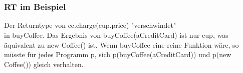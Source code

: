\section*{}
	\begin{frame}[fragile]
	\frametitle{RT im Beispiel}
	\begin{tcolorbox}[colback=blue!5,colframe=brightcerulean,title=RT im Beispiel]
		Der Returntype von cc.charge(cup.price) "verschwindet"\\
		in buyCoffee. Das Ergebnis von buyCoffee(aCreditCard) ist
		nur cup, was äquivalent zu new Coffee() ist. Wenn buyCoffee eine reine 				Funktion wäre, so müsste für jedes Programm p, sich 								p(buyCoffee(aCreditCard)) und p(new Coffee()) gleich verhalten.
	\end{tcolorbox}
\end{frame}

			